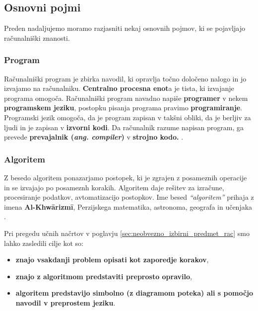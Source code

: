 
\subsection{Osnovni pojmi}
\label{sec:kaj_je_programiranje}


Preden nadaljujemo moramo razjasniti nekaj osnovnih pojmov, ki se
pojavljajo računalniški znanosti.

\subsubsection{Program}
\label{sec:program}

Računalniški program je zbirka navodil, ki opravlja točno določeno
nalogo in jo izvajamo na računalniku. \textbf{Centralno procesna
  enot}a je tista, ki izvajanje programa omogoča. Računalniški program
navadno napiše \textbf{programer} v nekem \textbf{programskem jeziku},
postopku pisanja programa pravimo \textbf{programiranje}. Programski
jezik omogoča, da je program zapisan v takšni obliki, da je berljiv za
ljudi in je zapisan v \textbf{izvorni kodi}. Da računalnik razume
napisan program, ga prevede \textbf{prevajalnik
  (\emph{ang. compiler})} v \textbf{strojno kodo.}
\cite{wiki:computer_program}.

\subsubsection{Algoritem}
\label{sec:algoritem}

Z besedo algoritem ponazarjamo postopek, ki je zgrajen z posameznih
operacije in se izvajajo po posameznh korakih. Algoritem daje rešitev
za izračune, procesiranje podatkov, avtomatizacijo postopkov.
Ime besed \emph{``algoritem''} prihaja z imena \textbf{Al-Khwārizmī},
Perzijskega matematika, astronoma, geografa in učenjaka \cite{wiki:algorithem}.

Pri pregedu učnih načrtov v poglavju
\ref{sec:neobvezno_izbirni_predmet_rac} smo lahko zasledili cilje kot
so:

\begin{itemize}
\tightlist
\item \textbf{znajo vsakdanji problem opisati kot zaporedje korakov},
\item \textbf{znajo z algoritmom predstaviti preprosto opravilo},
\item \textbf{algoritem predstavijo simbolno (z diagramom poteka) ali s
  pomočjo navodil v preprostem jeziku}.
\end{itemize}

